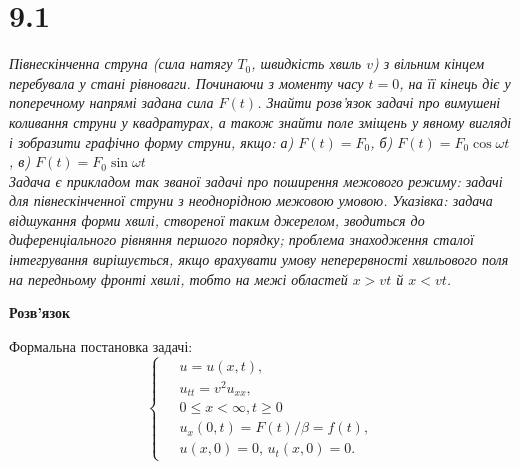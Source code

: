 


%


\section[Задача №9.1]{9.1}

\textit{Півнескінченна струна (сила натягу $T_0$, швидкість хвиль $v$) з вільним кінцем перебувала у стані рівноваги. Починаючи з моменту часу $t=0$, на її кінець діє у поперечному напрямі задана сила $F(t)$. Знайти розв’язок задачі про вимушені коливання струни у квадратурах, а також знайти поле зміщень у явному вигляді і зобразити графічно форму струни, якщо: а) $F(t) = F_0$, б) $F(t) = F_0 \cos\omega t$, в) $F(t) = F_0 \sin\omega t$\\
Задача є прикладом так званої задачі про поширення межового режиму: задачі для півнескінченної струни з неоднорідною межовою умовою. Указівка: задача відшукання форми хвилі, створеної таким джерелом, зводиться до диференціального рівняння першого порядку; проблема знаходження сталої інтегрування вирішується, якщо врахувати умову неперервності хвильового поля на передньому фронті хвилі, тобто на межі областей $x > vt$ й $x < vt$.}

\begin{center}
    \large{\textbf{Розв'язок}}
\end{center}

\noindent Формальна постановка задачі:
\begin{equation} %
    \left\{ \begin{aligned} %
            \;&u = u(x,t), \\
            &u_{tt} = v^2 u_{xx}, \\
            &0 \leq x < \infty, t \geq 0 \\
            &u_x(0,t) = F(t)/\beta = f(t),\\
            &u(x,0) = 0, \, u_t(x,0) = 0.
    \end{aligned} \right.
\end{equation}

